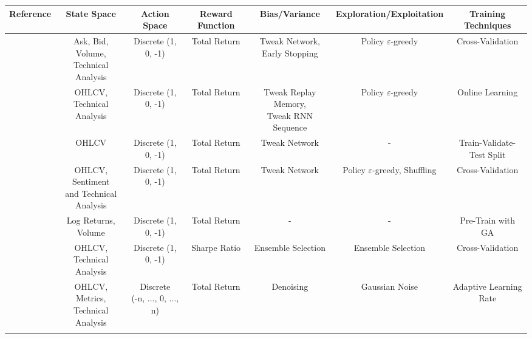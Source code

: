 \begin{sidewaystable}
\centering
\footnotesize
\begin{tabularx}{\linewidth}{@{}ccccccc@{}}
\toprule
\textbf{Reference} & \textbf{State Space} & \textbf{Action Space} & \textbf{Reward Function} & \textbf{Bias/Variance} & \textbf{Exploration/Exploitation} & \textbf{Training Techniques} \\ 
\midrule

\cite{carapuco_reinforcement_2018} & \makecell{Ask, Bid, Volume, \\ Technical Analysis} & Discrete (1, 0, -1) & Total Return & \makecell{Tweak Network, \\ Early Stopping} & Policy \(\varepsilon\)-greedy & Cross-Validation \\
\addlinespace

\cite{huang_financial_2018} & \makecell{OHLCV, \\ Technical Analysis} & Discrete (1, 0, -1) & Total Return & \makecell{Tweak Replay Memory, \\ Tweak RNN Sequence} & Policy \(\varepsilon\)-greedy & Online Learning \\
\addlinespace

\cite{rundo_deep_2019} & OHLCV & Discrete (1, 0, -1) & Total Return & Tweak Network & - & Train-Validate-Test Split \\
\addlinespace

\cite{saini_stock_2019} & \makecell{OHLCV, Sentiment \\ and Technical Analysis} & Discrete (1, 0, -1) & Total Return & Tweak Network & Policy \(\varepsilon\)-greedy, Shuffling &  Cross-Validation \\
\addlinespace

\cite{gran_deep_2019} & Log Returns, Volume & Discrete (1, 0, -1) & Total Return & - & - & Pre-Train with GA \\
\addlinespace

\cite{kong_empirical_2023} & \makecell{OHLCV, \\ Technical Analysis} & Discrete (1, 0, -1) & Sharpe Ratio & Ensemble Selection & Ensemble Selection & Cross-Validation \\
\addlinespace

\cite{li_deep_2019} & \makecell{OHLCV, Metrics, \\ Technical Analysis } & \makecell{Discrete \\ (-n, ..., 0, ..., n)} & Total Return & Denoising & Gaussian Noise & Adaptive Learning Rate \\
\addlinespace


\end{tabularx}
\end{sidewaystable}
